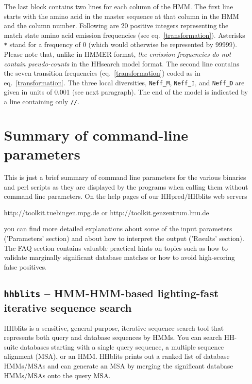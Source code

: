 \documentclass[11pt,a4paper]{article}
\begin{document}
 The last block contains two lines for each column of the HMM. The first line starts with the amino acid in the master sequence at that column in the HMM and the column number. Following are 20  positive integers representing the match state amino acid emission frequencies (see eq.\ \ref{transformation}). Asterisks \verb`*` stand for a frequency of 0 (which would otherwise be represented by 99999). Please note that, unlike in HMMER format,  \emph{the emission frequencies do not contain pseudo-counts} in the HHsearch model format. The second line contains the seven transition frequencies (eq.\ \ref{transformation}) coded as in eq.\ \ref{transformation}. The three local diversities, \verb`Neff_M`, \verb`Neff_I`, and \verb`Neff_D` are given in units of 0.001 (see next paragraph). The end of the model is indicated by a line containing only \verb`//`.


\section{Summary of command-line parameters}

This is just a brief summary of command line parameters for the various binaries and
perl scripts as they are displayed by the programs when calling them without 
command line parameters. On the help pages of our HHpred/HHblits web servers

\url{http://toolkit.tuebingen.mpg.de} or \url{http://toolkit.genzentrum.lmu.de}

you can find more detailed explanations about some of the input parameters 
('Parameters' section) and about how to interpret the output ('Results' section). The FAQ 
section contains valuable practical hints on topics such as how to validate marginally
significant database matches or how to avoid high-scoring false positives.


\subsection{{\tt hhblits} -- HMM-HMM-based lighting-fast iterative sequence search}

HHblits is a sensitive, general-purpose, iterative sequence search tool that represents
both query and database sequences by HMMs. You can search HH-suite databases starting
with a single query sequence, a multiple sequence alignment (MSA), or an HMM. HHblits
prints out a ranked list of database HMMs/MSAs and can generate an MSA by merging
the significant database HMMs/MSAs onto the query MSA.
\end{document}
